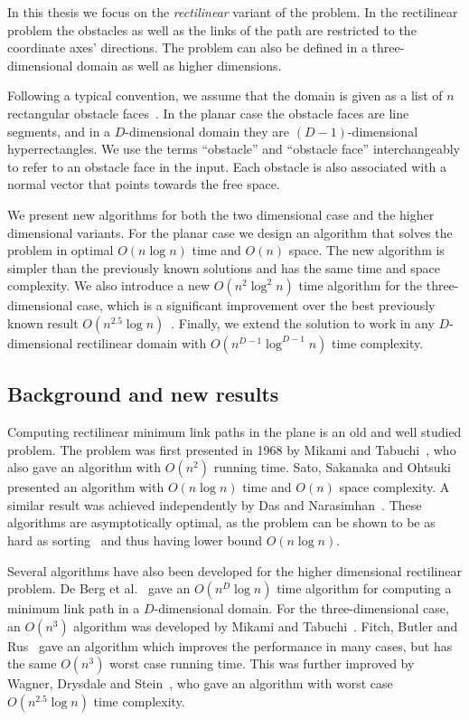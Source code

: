 \documentclass[english,gradu]{tktltiki2018}
\begin{document}
In this thesis we focus on the \emph{rectilinear} variant of the problem.
In the rectilinear problem the obstacles as well as the links of the path are restricted to the coordinate axes' directions.
The problem can also be defined in a three-dimensional domain as well as higher dimensions.

Following a typical convention, we assume that the domain is given as a list of $n$ rectangular obstacle faces~\cite{wagnerphd}.
In the planar case the obstacle faces are line segments, and in a $D$-dimensional domain they are $(D-1)$-dimensional hyperrectangles.
We use the terms ``obstacle'' and ``obstacle face'' interchangeably to refer to an obstacle face in the input.
Each obstacle is also associated with a normal vector that points towards the free space.

We present new algorithms for both the two dimensional case and the higher dimensional variants.
For the planar case we design an algorithm that solves the problem in optimal $O(n\log n)$ time and $O(n)$ space.
The new algorithm is simpler than the previously known solutions and has the same time and space complexity.
We also introduce a new $O(n^2\log^2 n)$ time algorithm for the three-dimensional case, which is a significant improvement over the best previously known result $O(n^{2.5}\log n)$~\cite{restricted}.
Finally, we extend the solution to work in any $D$-dimensional rectilinear domain with $O(n^{D-1}\log^{D-1}n)$ time complexity.

\subsection{Background and new results}

Computing rectilinear minimum link paths in the plane is an old and well studied problem.
The problem was first presented in 1968 by Mikami and Tabuchi~\cite{mikami}, who also gave an algorithm with $O(n^2)$ running time.
Sato, Sakanaka and Ohtsuki~\cite{sato} presented an algorithm with $O(n\log n)$ time and $O(n)$ space complexity.
A similar result was achieved independently by Das and Narasimhan~\cite{dasnar}.
These algorithms are asymptotically optimal, as the problem can be shown to be as hard as sorting~\cite{dasnar} and thus having lower bound $O(n\log n)$.

Several algorithms have also been developed for the higher dimensional rectilinear problem.
De Berg et al.~\cite{de1992} gave an $O(n^D\log n)$ time algorithm for computing a minimum link path in a $D$-dimensional domain.
For the three-dimensional case, an $O(n^3)$ algorithm was developed by Mikami and Tabuchi~\cite{mikami}.
Fitch, Butler and Rus~\cite{fitch} gave an algorithm which improves the performance in many cases, but has the same $O(n^3)$ worst case running time.
This was further improved by Wagner, Drysdale and Stein~\cite{wagner}, who gave an algorithm with worst case $O(n^{2.5}\log n)$ time complexity.
\end{document}
